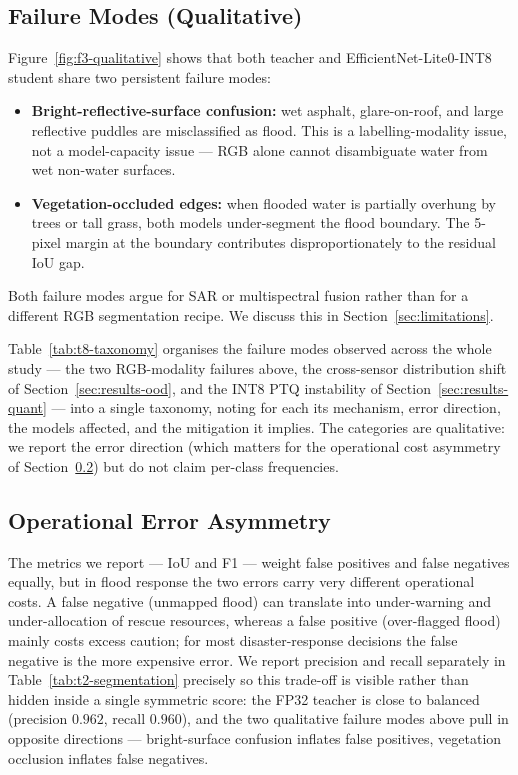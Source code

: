 \subsection{Failure Modes (Qualitative)}
\label{sec:discussion-failures}

Figure~\ref{fig:f3-qualitative} shows that both teacher and EfficientNet-Lite0-INT8 student share two persistent failure modes:
\begin{itemize}
\item \textbf{Bright-reflective-surface confusion:} wet asphalt, glare-on-roof, and large reflective puddles are misclassified as flood. This is a labelling-modality issue, not a model-capacity issue --- RGB alone cannot disambiguate water from wet non-water surfaces.
\item \textbf{Vegetation-occluded edges:} when flooded water is partially overhung by trees or tall grass, both models under-segment the flood boundary. The 5-pixel margin at the boundary contributes disproportionately to the residual IoU gap.
\end{itemize}

Both failure modes argue for SAR or multispectral fusion rather than for a different RGB segmentation recipe. We discuss this in Section~\ref{sec:limitations}.

Table~\ref{tab:t8-taxonomy} organises the failure modes observed across the whole study --- the two RGB-modality failures above, the cross-sensor distribution shift of Section~\ref{sec:results-ood}, and the INT8 PTQ instability of Section~\ref{sec:results-quant} --- into a single taxonomy, noting for each its mechanism, error direction, the models affected, and the mitigation it implies. The categories are qualitative: we report the error direction (which matters for the operational cost asymmetry of Section~\ref{sec:discussion-asymmetry}) but do not claim per-class frequencies.



\subsection{Operational Error Asymmetry}
\label{sec:discussion-asymmetry}

The metrics we report --- IoU and F1 --- weight false positives and false negatives equally, but in flood response the two errors carry very different operational costs. A false negative (unmapped flood) can translate into under-warning and under-allocation of rescue resources, whereas a false positive (over-flagged flood) mainly costs excess caution; for most disaster-response decisions the false negative is the more expensive error. We report precision and recall separately in Table~\ref{tab:t2-segmentation} precisely so this trade-off is visible rather than hidden inside a single symmetric score: the FP32 teacher is close to balanced (precision $0.962$, recall $0.960$), and the two qualitative failure modes above pull in opposite directions --- bright-surface confusion inflates false positives, vegetation occlusion inflates false negatives.

